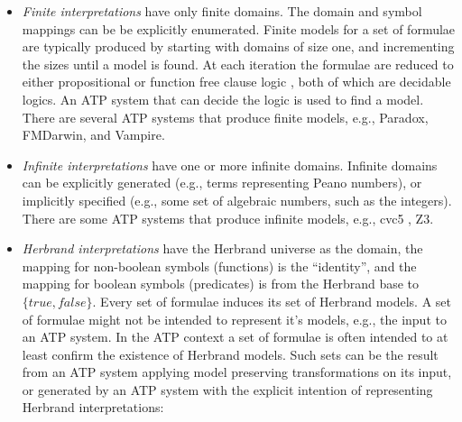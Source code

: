 \documentclass{easychair}
\newenvironment{packed_itemize}{
\vspace*{-0.2em}
\begin{itemize}
\setlength{\partopsep}{0pt}
\setlength{\itemsep}{1pt}
\setlength{\parskip}{0pt}
\setlength{\parsep}{0pt}
}{\end{itemize}}
\begin{document}
\begin{itemize}
\item {\em Finite interpretations} have only finite domains.
      The domain and symbol mappings can be be explicitly enumerated.
      Finite models for a set of formulae are typically produced by starting with domains of 
      size one, and incrementing the sizes until a model is found.
      At each iteration the formulae are reduced to either propositional \cite{CS03,McC03-MACE4-TR}
      or function free clause logic \cite{BF+09}, both of which are decidable logics.
      An ATP system that can decide the logic is used to find a model.
      There are several ATP systems that produce finite models, e.g., Paradox, FMDarwin, and 
      Vampire.
\item {\em Infinite interpretations} have one or more infinite domains.
      Infinite domains can be explicitly generated (e.g., terms representing Peano numbers), or 
      implicitly specified (e.g., some set of algebraic numbers, such as the integers).
      There are some ATP systems that produce infinite models, e.g., cvc5 \cite{BB+22-cvc5}, Z3.
\item {\em Herbrand interpretations} \cite{Her30} have the Herbrand universe as the domain, 
      the mapping for non-boolean symbols (functions) is the ``identity'', and the mapping
      for boolean symbols (predicates) is from the Herbrand base to $\{true,false\}$.
      Every set of formulae induces its set of Herbrand models.
      A set of formulae might not be intended to represent it's models, e.g., the input to 
      an ATP system. 
      In the ATP context a set of formulae is often intended to at least confirm the existence
      of Herbrand models.
      Such sets can be the result from an ATP system applying model preserving transformations 
      on its input, or generated by an ATP system with the explicit intention of representing 
      Herbrand interpretations:
\end{itemize}
\end{document}
